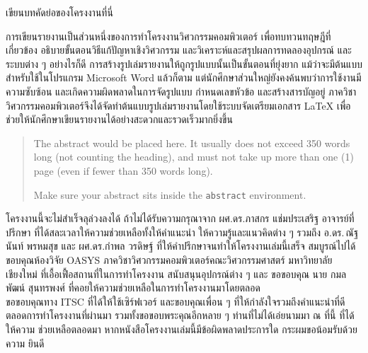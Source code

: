 \maketitle
\makesignature

\ifproject
\begin{abstractTH}
เขียนบทคัดย่อของโครงงานที่นี่

การเขียนรายงานเป็นส่วนหนึ่งของการทำโครงงานวิศวกรรมคอมพิวเตอร์
เพื่อทบทวนทฤษฎีที่เกี่ยวข้อง อธิบายขั้นตอนวิธีแก้ปัญหาเชิงวิศวกรรม และวิเคราะห์และสรุปผลการทดลองอุปกรณ์ และระบบต่าง ๆ
\enskip อย่างไรก็ดี การสร้างรูปเล่มรายงานให้ถูกรูปแบบนั้นเป็นขั้นตอนที่ยุ่งยาก
แม้ว่าจะมีต้นแบบสำหรับใช้ในโปรแกรม Microsoft Word แล้วก็ตาม
แต่นักศึกษาส่วนใหญ่ยังคงค้นพบว่าการใช้งานมีความซับซ้อน และเกิดความผิดพลาดในการจัดรูปแบบ กำหนดเลขหัวข้อ และสร้างสารบัญอยู่
\enskip ภาควิชาวิศวกรรมคอมพิวเตอร์จึงได้จัดทำต้นแบบรูปเล่มรายงานโดยใช้ระบบจัดเตรียมเอกสาร
\LaTeX{} เพื่อช่วยให้นักศึกษาเขียนรายงานได้อย่างสะดวกและรวดเร็วมากยิ่งขึ้น
\end{abstractTH}

\begin{abstract}
The abstract would be placed here. It usually does not exceed 350 words
long (not counting the heading), and must not take up more than one (1) page
(even if fewer than 350 words long).

Make sure your abstract sits inside the \texttt{abstract} environment.
\end{abstract}

\iffalse
\begin{dedication}
This document is dedicated to all Chiang Mai University students.

Dedication page is optional.
\end{dedication}
\fi %

\begin{acknowledgments}
\indent โครงงานนี้จะไม่สำเร็จลุล่วงลงได้ ถ้าไม่ได้รับความกรุณาจาก ผศ.ดร.ภาสกร แช่มประเสริฐ
อาจารย์ที่ปรึกษา ที่ได้สละเวลาให้ความช่วยเหลือทั้งให้คำแนะนำ ให้ความรู้และแนวคิดต่าง ๆ รวมถึง
อ.ดร.\,ณัฐนันท์ พรหมสุข และ ผศ.ดร.กำพล วรดิษฐ์ ที่ให้คำปรึกษาจนทำให้โครงงานเล่มนี้เสร็จ
สมบูรณ์ไปได้ \\
\indent ขอบคุณห้องวิจัย OASYS ภาควิชาวิศวกรรมคอมพิวเตอร์คณะวิศวกรรมศาสตร์
มหาวิทยาลัยเชียงใหม่ ที่เอื้อเฟื้อสถานที่ในการทำโครงงาน สนับสนุนอุปกรณ์ต่าง ๆ และ
ขอขอบคุณ นาย กมลพัฒน์ สุนทรพงศ์ ที่คอยให้ความช่วยเหลือในการทำโครงงานมาโดยตลอด \\
\indent ขอขอบคุณทาง ITSC ที่ได้ให้ใช้เซิร์ฟเวอร์ และขอบคุณเพื่อน ๆ ที่ให้กำลังใจรวมถึงคำแนะนำที่ดีตลอดการทำโครงงานที่ผ่านมา 
รวมทั้งขอขอบพระคุณอีกหลาย ๆ ท่านที่ไม่ได้เอ่ยนามมา ณ ที่นี้ ที่ได้ให้ความ
ช่วยเหลือตลอดมา หากหนังสือโครงงานเล่มนี้มีข้อผิดพลาดประการใด กระผมขอน้อมรับด้วยความ
ยินดี



\end{acknowledgments}%
\fi %

\contentspage

\ifproject
\figurelistpage

\tablelistpage
\fi %



